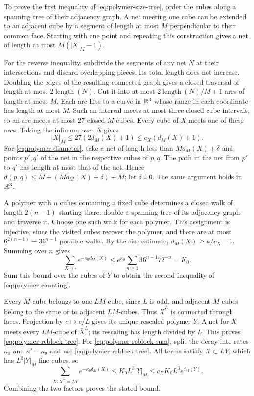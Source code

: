 To prove the first inequality of \eqref{eq:polymer-size-tree}, order
the cubes along a spanning tree of their adjacency graph. A net
meeting one cube can be extended to an adjacent cube by a segment of
length at most $M$ perpendicular to their common face. Starting with
one point and repeating this construction gives a net of length at
most $M(|X|_M-1)$.

For the reverse inequality, subdivide the segments of any net $N$ at
their intersections and discard overlapping pieces. Its total length
does not increase. Doubling the edges of the resulting connected
graph gives a closed traversal of length at most
$2\operatorname{length}(N)$. Cut it into at most
$2\operatorname{length}(N)/M+1$ arcs of length at most $M$.
Each arc lifts to a curve in $\mathbb R^3$ whose range in each coordinate
has length at most $M$. Such an interval meets at most three closed
cube intervals, so an arc meets at most $27$ closed $M$-cubes.
Every cube of $X$ meets one of these arcs. Taking the infimum over
$N$ gives
\[
 |X|_M\le27(2d_M(X)+1)\le c_X(d_M(X)+1).
\]
For \eqref{eq:polymer-diameter}, take a net of length less than
$Md_M(X)+\delta$ and points $p',q'$ of the net in the respective
cubes of $p,q$. The path in the net from $p'$ to $q'$ has length
at most that of the net. Hence
$d(p,q)\le M+(Md_M(X)+\delta)+M$; let $\delta\downarrow0$.
The same argument holds in $\mathbb R^3$.

A polymer with $n$ cubes containing a fixed cube determines a closed
walk of length $2(n-1)$ starting there: double a spanning tree of its
adjacency graph and traverse it. Choose one such walk for each
polymer. This assignment is injective, since the visited cubes recover
the polymer, and there are at most $6^{2(n-1)}=36^{n-1}$ possible
walks. By the size estimate, $d_M(X)\ge n/c_X-1$. Summing over $n$
gives
\[
 \sum_{X\supset\square}e^{-\kappa_0d_M(X)}
       \le e^{\kappa_0}\sum_{n\ge1}36^{n-1}72^{-n}=K_0.
\]
Sum this bound over the cubes of $Y$ to obtain the second inequality
of \eqref{eq:polymer-counting}.

Every $M$-cube belongs to one $LM$-cube, since $L$ is odd, and adjacent
$M$-cubes belong to the same or to adjacent $LM$-cubes. Thus $\bar X^L$
is connected through faces. Projection by $c\mapsto c/L$ gives its
unique rescaled polymer $Y$. A net for $X$ meets every $LM$-cube of
$\bar X^L$; its rescaling has length divided by $L$. This proves
\eqref{eq:polymer-reblock-tree}. For \eqref{eq:polymer-reblock-sum},
split the decay into rates $\kappa_0$ and $\kappa'-\kappa_0$ and use
\eqref{eq:polymer-reblock-tree}. All terms satisfy $X\subset LY$,
which has $L^3|Y|_M$ fine cubes, so
\[
 \sum_{X:\bar X^L=LY}e^{-\kappa_0d_M(X)}
      \le K_0L^3|Y|_M\le c_XK_0L^3e^{d_M(Y)}.
\]
Combining the two factors proves the stated bound.

